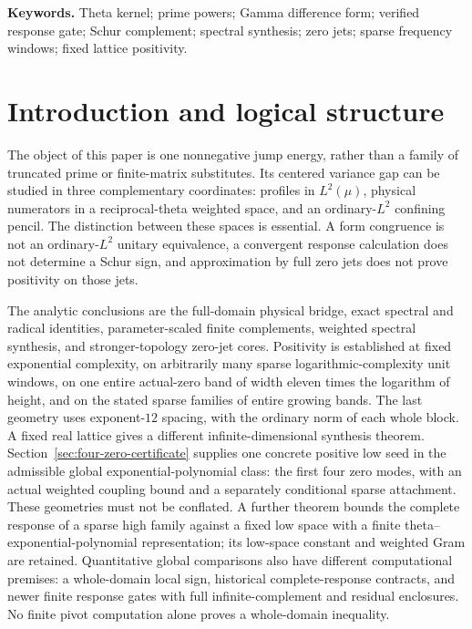 \documentclass[11pt,a4paper]{article}
\numberwithin{equation}{section}
\theoremstyle{definition}\newtheorem{definition}[theorem]{Definition}
\theoremstyle{remark}\newtheorem{remark}[theorem]{Remark}
\begin{document}
\begin{abstract}
\end{abstract}
\noindent\textbf{Keywords.} Theta kernel; prime powers; Gamma difference form; verified response gate; Schur complement; spectral synthesis; zero jets; sparse frequency windows; fixed lattice positivity.
\clearpage\setcounter{tocdepth}{1}\tableofcontents\clearpage

\section{Introduction and logical structure}\label{sec:intro}
The object of this paper is one nonnegative jump energy, rather than a family of truncated prime or finite-matrix substitutes. Its centered variance gap can be studied in three complementary coordinates: profiles in $L^2(\mu)$, physical numerators in a reciprocal-theta weighted space, and an ordinary-$L^2$ confining pencil. The distinction between these spaces is essential. A form congruence is not an ordinary-$L^2$ unitary equivalence, a convergent response calculation does not determine a Schur sign, and approximation by full zero jets does not prove positivity on those jets.

The analytic conclusions are the full-domain physical bridge, exact spectral and radical identities, parameter-scaled finite complements, weighted spectral synthesis, and stronger-topology zero-jet cores. Positivity is established at fixed exponential complexity, on arbitrarily many sparse logarithmic-complexity unit windows, on one entire actual-zero band of width eleven times the logarithm of height, and on the stated sparse families of entire growing bands. The last geometry uses exponent-$12$ spacing, with the ordinary norm of each whole block. A fixed real lattice gives a different infinite-dimensional synthesis theorem. Section~\ref{sec:four-zero-certificate} supplies one concrete positive low seed in the admissible global exponential-polynomial class: the first four zero modes, with an actual weighted coupling bound and a separately conditional sparse attachment. These geometries must not be conflated. A further theorem bounds the complete response of a sparse high family against a fixed low space with a finite theta--exponential-polynomial representation; its low-space constant and weighted Gram are retained. Quantitative global comparisons also have different computational premises: a whole-domain local sign, historical complete-response contracts, and newer finite response gates with full infinite-complement and residual enclosures. No finite pivot computation alone proves a whole-domain inequality.
\end{document}
